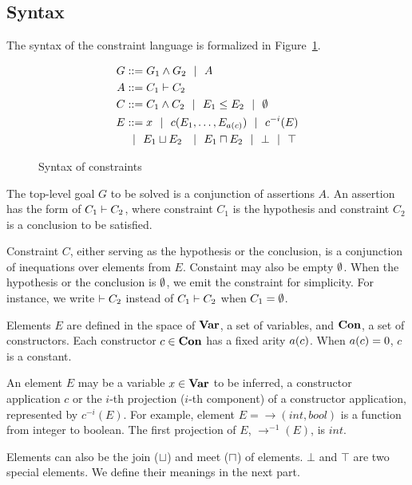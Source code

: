 \subsection{Syntax}

The syntax of the constraint language is formalized in
Figure~\ref{figure:lang:syntax}.

\begin{figure}
\hfil
\begin{minipage}{2in}
\begin{align*}
G &::= G_1 \land G_2 \ \ | \ \  A \\
A &::= C_1 \vdash C_2 \\
C &::= C_1 \land C_2 \ \ | \ \  E_1 \leq E_2 \ \ | \ \  \emptyset \\
E &::= x \ \ | \ \  c(E_1,\dots,E_{a(c)}) \ \ | \ \  c^{-i}(E) \\
  & \ \ | \ \  E_1 \sqcup E_2 \
\ \ | \ \  E_1 \sqcap E_2 \ \ | \ \  \bot \ \ | \ \  \top
\end{align*}
\end{minipage}
\hfil
\caption{Syntax of constraints}
\label{figure:lang:syntax}
\end{figure}

The top-level goal $G$ to be solved is a conjunction of assertions $A$. An
assertion has the form of $C_1 \vdash C_2$, where constraint $C_1$ is the
hypothesis and constraint $C_2$ is a conclusion to be satisfied.
 
Constraint $C$, either serving as the hypothesis or the conclusion, is a
conjunction of inequations over elements from $E$. Constaint may also be empty
$\emptyset$. When the hypothesis or the conclusion is $\emptyset$, we emit the
constraint for simplicity. For instance, we write $ \vdash C_2$ instead of $
C_1 \vdash C_2$ when $C_1=\emptyset$.

Elements $E$ are defined in the space of $\mathbf{Var}$, a set of variables, and
$\mathbf{Con}$, a set of constructors. Each constructor $c\in \mathbf{Con}$ has a fixed
arity $a(c)$.  When $a(c)=0$, $c$ is a constant.
 
An element $E$ may be a variable $x\in\mathbf{Var}$ to be inferred, a constructor
application $c$ or the $i$-th projection ($i$-th component) of a constructor
application, represented by $c^{-i}(E)$. For example, element
$E=\rightarrow(int, bool)$ is a function from integer to boolean. The first
projection of $E$, $\rightarrow^{-1} (E)$, is $int$.

Elements can also be the join ($\sqcup$) and meet ($\sqcap$) of elements. $\bot$
and $\top$ are two special elements. We define their meanings in the next part.

